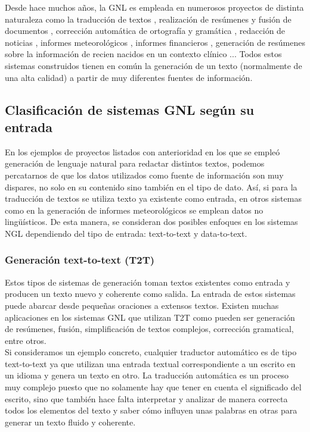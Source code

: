 Desde hace muchos años, la GNL es empleada en numerosos proyectos de distinta naturaleza como la traducción de textos \citep{Cho2014LearningPR}, realización de resúmenes y fusión de documentos \citep{clarke2010discourse}, corrección automática de ortografía y gramática \citep{Kukich1992TechniquesFA}, redacción de noticias \citep{molina2011generating}, informes meteorológicos \citep{goldberg1994using}, informes financieros \citep{Kukich1983DesignOA}, generación de resúmenes sobre la información de recien nacidos en un contexto clínico \citep{BabyTalk}... Todos estos sistemas construidos tienen en común la generación de un texto (normalmente de una alta calidad) a partir de muy diferentes fuentes de información. \\

\subsection{Clasificación de sistemas GNL según su entrada}\label{cap:ngltiposentrada}
En los ejemplos de proyectos listados con anterioridad en los que se empleó generación de lenguaje natural para redactar distintos textos, podemos percatarnos de que los datos utilizados como fuente de información son muy dispares, no solo en su contenido sino también en el tipo de dato. Así, si para la traducción de textos se utiliza texto ya existente como entrada, en otros sistemas como en la generación de informes meteorológicos se emplean datos no lingüísticos. De esta manera, se consideran dos posibles enfoques en los sistemas NGL dependiendo del tipo de entrada: text-to-text y data-to-text.\\


\subsubsection{Generación text-to-text (T2T)}
Estos tipos de sistemas de generación toman textos existentes como entrada y producen un texto nuevo y coherente como salida. La entrada de estos sistemas puede abarcar desde pequeñas oraciones a extensos textos. Existen muchas aplicaciones en los sistemas GNL que utilizan T2T como pueden ser generación de resúmenes, fusión, simplificación de textos complejos, corrección gramatical, entre otros.\\

Si consideramos un ejemplo concreto, cualquier traductor automático es de tipo text-to-text ya que utilizan una entrada textual correspondiente a un escrito en un idioma y genera un texto en otro. La traducción automática es un proceso muy complejo puesto que no solamente hay que tener en cuenta el significado del escrito, sino que también hace falta interpretar y analizar de manera correcta todos los elementos del texto y saber cómo influyen unas palabras en otras para generar un texto fluido y coherente.\\


